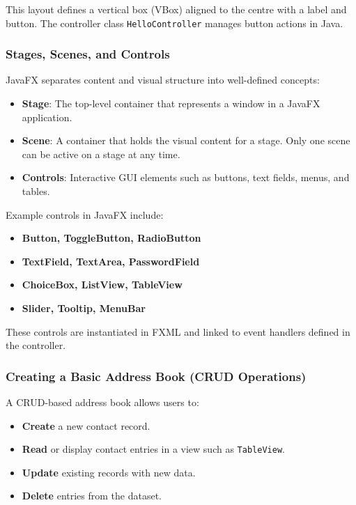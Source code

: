 \documentclass{article}
\newcommand{\codecmd}[1]{\textcolor[rgb]{0,0.5,0}{\texttt{#1}}}
\begin{document}
This layout defines a vertical box (VBox) aligned to the centre with a label and button. The controller class \codecmd{HelloController} manages button actions in Java.

\subsubsection{Stages, Scenes, and Controls}

JavaFX separates content and visual structure into well-defined concepts:

\begin{itemize}
    \item \textbf{Stage}: The top-level container that represents a window in a JavaFX application.
    \item \textbf{Scene}: A container that holds the visual content for a stage. Only one scene can be active on a stage at any time.
    \item \textbf{Controls}: Interactive GUI elements such as buttons, text fields, menus, and tables.
\end{itemize}

Example controls in JavaFX include:

\begin{itemize}
    \item \textbf{Button, ToggleButton, RadioButton}
    \item \textbf{TextField, TextArea, PasswordField}
    \item \textbf{ChoiceBox, ListView, TableView}
    \item \textbf{Slider, Tooltip, MenuBar}
\end{itemize}

These controls are instantiated in FXML and linked to event handlers defined in the controller.

\subsubsection{Creating a Basic Address Book (CRUD Operations)}

A CRUD-based address book allows users to:

\begin{itemize}
    \item \textbf{Create} a new contact record.
    \item \textbf{Read} or display contact entries in a view such as \codecmd{TableView}.
    \item \textbf{Update} existing records with new data.
    \item \textbf{Delete} entries from the dataset.
\end{itemize}
\end{document}
